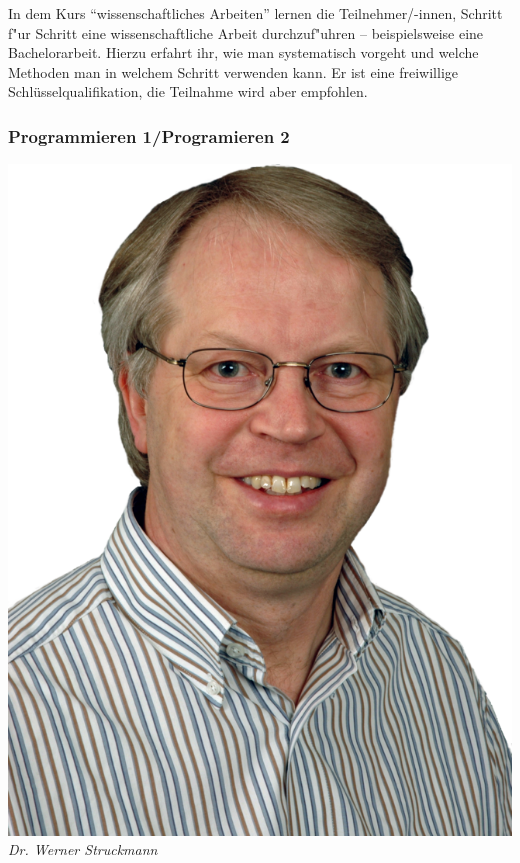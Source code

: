In dem Kurs "`wissenschaftliches Arbeiten"' lernen die Teilnehmer/-innen, Schritt f"ur Schritt eine wissenschaftliche Arbeit durchzuf"uhren -- beispielsweise eine Bachelorarbeit.
Hierzu erfahrt ihr, wie man systematisch vorgeht und welche Methoden
man in welchem Schritt verwenden kann. Er ist eine freiwillige
Schlüsselqualifikation, die Teilnahme wird aber empfohlen.



\subsubsection{Programmieren 1/Programieren 2}
 \includegraphics[width=0.6\linewidth]{bilder/dozenten/struck.png}\\
\textit{Dr. Werner Struckmann}

